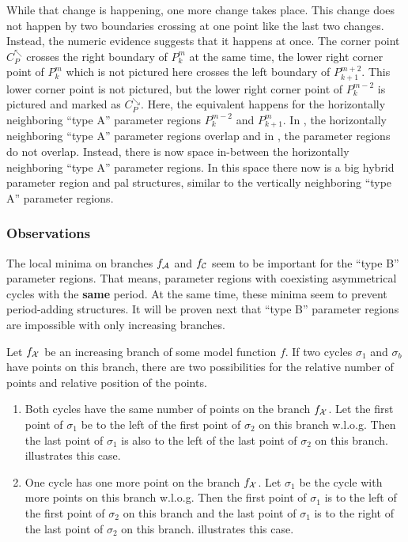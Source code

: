 While that change is happening, one more change takes place.
This change does not happen by two boundaries crossing at one point like the last two changes.
Instead, the numeric evidence suggests that it happens at once.
The corner point $C_P^\nwarrow$ crosses the right boundary of $P^m_k$ at the same time, the lower right corner point of $P^{m}_{k}$ which is not pictured here crosses the left boundary of $P^{m+2}_{k+1}$.
This lower corner point is not pictured, but the lower right corner point of $P^{m-2}_k$ is pictured and marked as $C_P^\searrow$.
Here, the equivalent happens for the horizontally neighboring ``type A'' parameter regions $P^{m-2}_k$ and $P^m_{k+1}$.
In , the horizontally neighboring ``type A'' parameter regions overlap and in , the parameter regions do not overlap.
Instead, there is now space in-between the horizontally neighboring ``type A'' parameter regions.
In this space there now is a big hybrid parameter region and \gls{pal} structures, similar to the vertically neighboring ``type A'' parameter regions.

\subsubsection{Observations}

The local minima on branches $f_{\mathcal{A}}$ and $f_{\mathcal{C}}$ seem to be important for the ``type B'' parameter regions.
That means, parameter regions with coexisting asymmetrical cycles with the \textbf{same} period.
At the same time, these minima seem to prevent period-adding structures.
It will be proven next that ``type B'' parameter regions are impossible with only increasing branches.

\begin{lemma}
	Let $f_{\mathcal{X}}$ be an increasing branch of some model function $f$.
	If two cycles $\sigma_1$ and $\sigma_b$ have points on this branch, there are two possibilities for the relative number of points and relative position of the points.
	\begin{enumerate}
		\item Both cycles have the same number of points on the branch $f_{\mathcal{X}}$.
		      Let the first point of $\sigma_1$ be to the left of the first point of $\sigma_2$ on this branch w.l.o.g.
		      Then the last point of $\sigma_1$ is also to the left of the last point of $\sigma_2$ on this branch.
		       illustrates this case.
		\item One cycle has one more point on the branch $f_{\mathcal{X}}$.
		      Let $\sigma_1$ be the cycle with more points on this branch w.l.o.g.
		      Then the first point of $\sigma_1$ is to the left of the first point of $\sigma_2$ on this branch and the last point of $\sigma_1$ is to the right of the last point of $\sigma_2$ on this branch.
		       illustrates this case.
	\end{enumerate}
	\label{lemma:add.num.pos.points.increasing}
\end{lemma}

